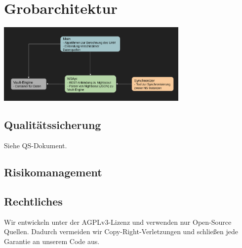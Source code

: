 \documentclass[accentcolor=tud0b,12pt,paper=a4]{tudreport}
\begin{document}
	\chapter{Grobarchitektur}
	
	\centering
\includegraphics[width=0.7\textwidth]{architektur.png}
	
	\section{Qualitätssicherung}
	Siehe QS-Dokument.
	
	\section{Risikomanagement}
	
	\section{Rechtliches}
	
	Wir entwickeln unter der AGPLv3-Lizenz und verwenden nur Open-Source Quellen. Dadurch vermeiden wir Copy-Right-Verletzungen und schließen jede Garantie an unserem Code aus.
	
\end{document}
